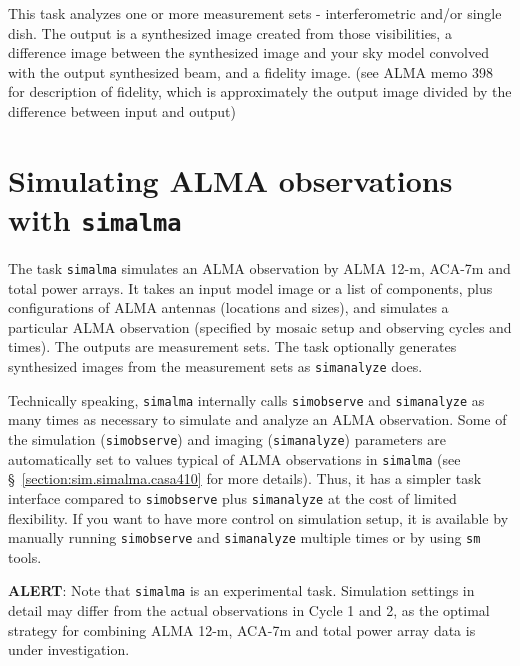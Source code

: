 This task analyzes one or more measurement sets - interferometric and/or single dish.
The output is a synthesized image created from those visibilities, a difference image
between the synthesized image and your sky model convolved with the
output synthesized beam, and a fidelity image. (see ALMA memo 398 for
description of fidelity, which is approximately the output image
divided by the difference between input and output)

\section{Simulating ALMA observations with {\tt simalma}}
\label{section:sim.simalma}

The task {\tt simalma} simulates an ALMA observation by ALMA 12-m, ACA-7m
and total power arrays.
It takes an input model image or a list of components, plus
configurations of ALMA antennas (locations and sizes), and simulates a
particular ALMA observation (specified by mosaic setup and
observing cycles and times).  The outputs are measurement sets.
The task optionally generates synthesized images from the measurement
sets as {\tt simanalyze} does. 

Technically speaking, {\tt simalma} internally
calls {\tt simobserve} and {\tt simanalyze} as many times as necessary
to simulate and analyze an ALMA observation.
Some of the simulation ({\tt simobserve}) and imaging 
({\tt simanalyze}) parameters are automatically set to values typical
of ALMA observations in {\tt simalma} (see
\S~\ref{section:sim.simalma.casa410} for more details). 
Thus, it has a simpler task interface compared to {\tt simobserve} plus
{\tt simanalyze} at the cost of limited flexibility. 
If you want to have more control on simulation setup, it is available
by manually running {\tt simobserve} and {\tt simanalyze} multiple
times or by using {\tt sm} tools.

{\bf ALERT}: 
Note that {\tt simalma} is an experimental task. Simulation settings in
detail may differ from the actual observations in Cycle 1 and 2, as the optimal
strategy for combining ALMA 12-m, ACA-7m and total power array data is under
investigation.

